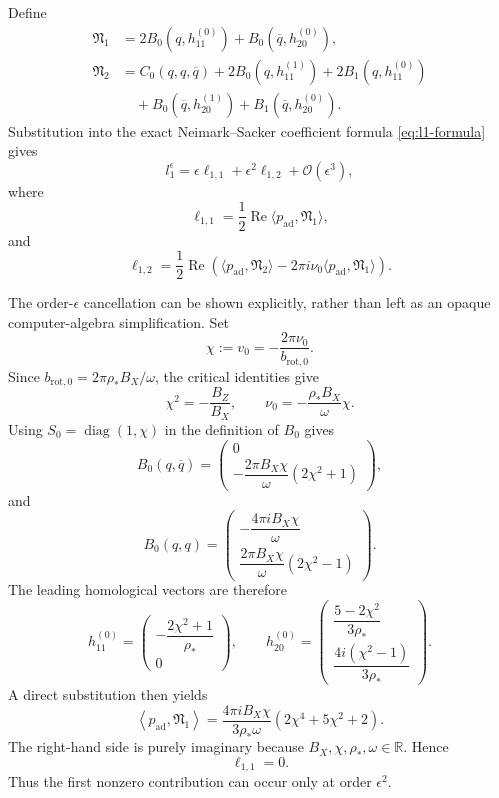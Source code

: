 \documentclass[11pt]{amsart}
\theoremstyle{remark}
\newcommand{\cO}{\mathcal{O}}
\begin{document}
Define
\[
\begin{aligned}
\mathfrak N_1
&=2B_0(q,h_{11}^{(0)})
+B_0(\overline q,h_{20}^{(0)}),\\
\mathfrak N_2
&=C_0(q,q,\overline q)
+2B_0(q,h_{11}^{(1)})+2B_1(q,h_{11}^{(0)})\\
&\quad+B_0(\overline q,h_{20}^{(1)})
+B_1(\overline q,h_{20}^{(0)}).
\end{aligned}
\]
Substitution into the exact Neimark--Sacker coefficient formula
\eqref{eq:l1-formula} gives
\[
 l_1^\epsilon
=\epsilon\ell_{1,1}+\epsilon^2\ell_{1,2}+\cO(\epsilon^3),
\]
where
\[
 \ell_{1,1}=\frac12\operatorname{Re}
\langle p_{\mathrm{ad}},\mathfrak N_1\rangle,
\]
and
\[
 \ell_{1,2}
=\frac12\operatorname{Re}\left(
\langle p_{\mathrm{ad}},\mathfrak N_2\rangle
-2\pi i\nu_0\langle p_{\mathrm{ad}},\mathfrak N_1\rangle
\right).
\]

The order-\(\epsilon\) cancellation can be shown explicitly, rather than
left as an opaque computer-algebra simplification.  Set
\[
 \chi:=v_0=-\frac{2\pi\nu_0}{b_{\mathrm{rot},0}}.
\]
Since \(b_{\mathrm{rot},0}=2\pi\rho_*B_X/\omega\), the critical identities give
\[
 \chi^2=-\frac{B_Z}{B_X},
 \qquad
 \nu_0=-\frac{\rho_*B_X}{\omega}\chi.
\]
Using \(S_0=\operatorname{diag}(1,\chi)\) in the definition of \(B_0\) gives
\[
 B_0(q,\overline q)
 =
 \begin{pmatrix}
 0\\[1mm]
 -\dfrac{2\pi B_X\chi}{\omega}(2\chi^2+1)
 \end{pmatrix},
\]
and
\[
 B_0(q,q)
 =
 \begin{pmatrix}
 -\dfrac{4\pi i B_X\chi}{\omega}\\[1mm]
 \dfrac{2\pi B_X\chi}{\omega}(2\chi^2-1)
 \end{pmatrix}.
\]
The leading homological vectors are therefore
\[
 h_{11}^{(0)}
 =
 \begin{pmatrix}
 -\dfrac{2\chi^2+1}{\rho_*}\\[1mm]0
 \end{pmatrix},
 \qquad
 h_{20}^{(0)}
 =
 \begin{pmatrix}
 \dfrac{5-2\chi^2}{3\rho_*}\\[2mm]
 \dfrac{4i(\chi^2-1)}{3\rho_*}
 \end{pmatrix}.
\]
A direct substitution then yields
\begin{equation}\label{eq:leading-cancellation}
 \left\langle p_{\mathrm{ad}},\mathfrak N_1\right\rangle
 =
 \frac{4\pi iB_X\chi}{3\rho_*\omega}
 \left(2\chi^4+5\chi^2+2\right).
\end{equation}
The right-hand side is purely imaginary because
\(B_X,\chi,\rho_*,\omega\in\mathbb{R}\).  Hence
\[
 \boxed{\ell_{1,1}=0}.
\]
Thus the first nonzero contribution can occur only at order
\(\epsilon^2\).
\end{document}

